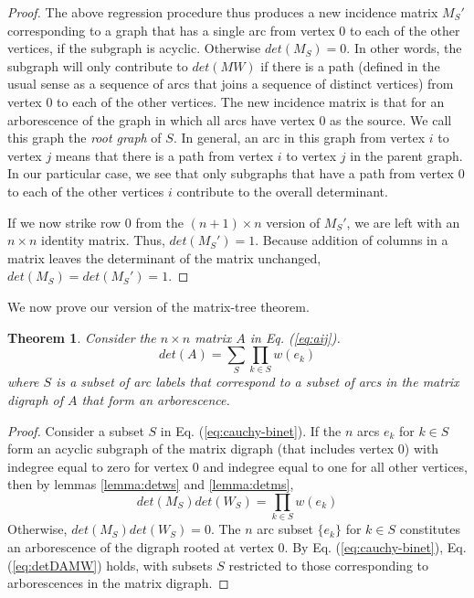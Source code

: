 \documentclass{article}
\newtheorem{theorem}{Theorem}
\begin{document}
\begin{proof}
The above regression procedure thus
produces a new incidence matrix $M_S'$ corresponding to a
graph that has a single arc from
vertex $0$ to each of the other vertices, if the subgraph is
acyclic.  Otherwise $det(M_S) = 0$.  In other words, the
subgraph will only contribute to $det(MW)$ if there is a
path (defined in the usual sense as a sequence of arcs that joins a sequence of distinct vertices) from vertex $0$ to each of the other vertices.  The new incidence matrix is that for an arborescence of the
graph in which all arcs have vertex $0$ as the source.
We call this graph the {\em root graph} of $S$.  In general,
an arc in this graph from vertex $i$ to vertex $j$ means that
there is a path from vertex $i$ to vertex $j$ in the parent graph.
In our particular case, we see that only subgraphs that have
a path from vertex $0$ to each of the other vertices $i$
contribute to the overall determinant.

If we now strike row $0$ from the $(n + 1) \times n$ version of
$M_S'$, we are left with an $n \times n$ identity matrix.
Thus, $det(M_S') = 1$.  Because addition
of columns in a matrix leaves the determinant of the matrix unchanged,
$det(M_S) = det(M_S') = 1$.
\end{proof}

We now prove our version of the matrix-tree theorem.

\begin{theorem}
Consider the $n \times n$ matrix $A$ in Eq. (\ref{eq:aij}).
\begin{equation}
det(A) =
\sum_{S} \prod_{k \in S} w(e_k)
\label{eq:detDAsum}
\end{equation}
where $S$ is a subset of arc labels that correspond to a subset of arcs
in the matrix digraph of $A$ that form an arborescence.
\label{theorem:detDA}
\end{theorem}

\begin{proof}
Consider a subset $S$ in Eq. (\ref{eq:cauchy-binet}).
If the $n$ arcs $e_k$ for $k \in S$
form an acyclic subgraph of the
matrix digraph (that includes vertex $0$) with
indegree equal to zero for vertex $0$ and indegree equal
to one for all other vertices, then
by lemmas \ref{lemma:detws} and \ref{lemma:detms},
\begin{equation}
det(M_S) det(W_S) = \prod_{k \in S} w(e_k)
\label{eq:detmsws}
\end{equation}
Otherwise, $det(M_S) det(W_S) = 0$.
The $n$ arc subset $\{e_k\}$ for
$k \in S$ constitutes an arborescence of the digraph rooted at
vertex $0$.  By Eq. (\ref{eq:cauchy-binet}),
Eq. (\ref{eq:detDAMW}) holds, with subsets $S$ restricted to
those corresponding to arborescences in the matrix digraph.
\end{proof}
\end{document}
